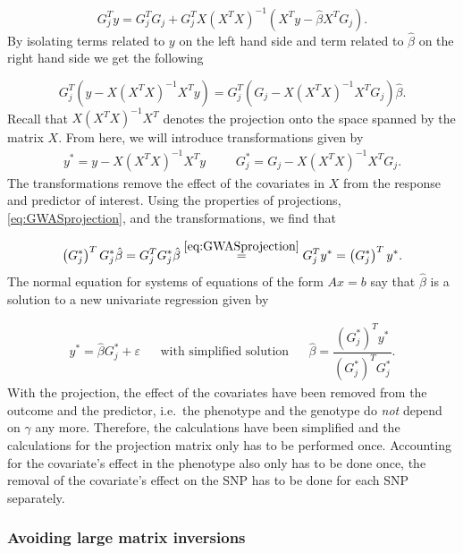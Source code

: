 \begin{equation}
	G^T_j y = G_j^TG_j + G_j^TX (X^TX)^{-1}(X^Ty - \hat{\beta} X^TG_j).
\end{equation}
By isolating terms related to $ y $ on the left hand side and term related to $ \hat{\beta} $ on the right hand side we get the following

\begin{equation} \label{eq:GWASprojection}
	G_j^T(y - X(X^TX)^{-1}X^Ty) = G_j^T(G_j - X(X^TX)^{-1}X^TG_j) \hat{\beta}.
\end{equation}
Recall that $ X(X^TX)^{-1}X^T $ denotes the projection onto the space spanned by the matrix $ X $. From here, we will introduce transformations given by 
\begin{align}
	y^\ast = y - X(X^TX)^{-1}X^Ty & & & G_j^{\ast} = G_j - X(X^TX)^{-1}X^TG_j.
\end{align}
The transformations remove the effect of the covariates in $ X $ from the response and predictor of interest. Using the properties of projections, \cref{eq:GWASprojection}, and the transformations, we find that 

\begin{equation}
	\left( G_j^{\ast} \right)^T G_j^{\ast} \hat{\beta} = G_j^T G_j^{\ast} \hat{\beta} \stackrel{\ref{eq:GWASprojection}}{=} G_j^T y^{\ast} = \left( G_j^{\ast} \right)^T y^{\ast}.
\end{equation}
The normal equation for systems of equations of the form $ Ax=b $ say that $ \hat{\beta} $ is a solution to a new univariate regression given by

\begin{align}\label{eq:univarGWAS}
	y^\ast = \hat{\beta} G_j^{\ast} + \varepsilon&   &\text{with simplified solution}&  &\hat{\beta} = \dfrac{\left( G_j^{\ast} \right)^T y^{\ast}}{\left( G_j^{\ast} \right)^T G_j^{\ast}}.
\end{align}
With the projection, the effect of the covariates have been removed from the outcome and the predictor, i.e.\ the phenotype and the genotype do \textit{not} depend on $ \gamma $ any more. Therefore, the calculations have been simplified and the calculations for the projection matrix only has to be performed once. Accounting for the covariate's effect in the phenotype also only has to be done once, the removal of the covariate's effect on the SNP has to be done for each SNP separately.


\subsubsection{Avoiding large matrix inversions}


